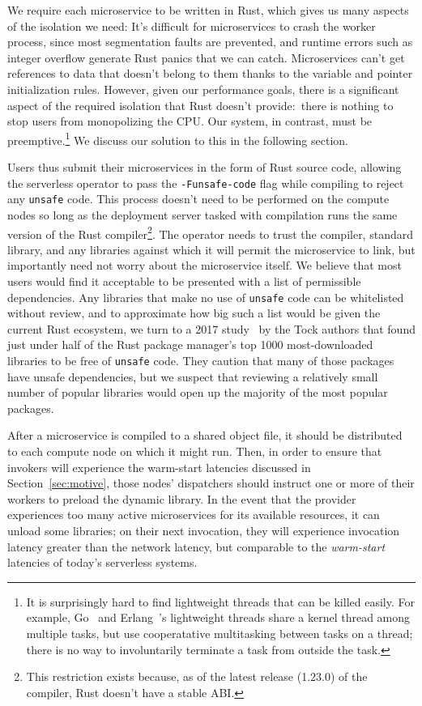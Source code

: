 We require each microservice to be written in Rust, which gives us many aspects of
the isolation we need:  It's difficult for microservices to crash the worker process,
since most segmentation faults are prevented, and runtime errors such as integer
overflow generate Rust panics that we can catch.  Microservices can't get references
to data that doesn't belong to them thanks to the variable and pointer initialization
rules.  
However, given our performance goals, there is a significant aspect of the
required isolation that Rust doesn't provide:\ there is nothing to stop users from
monopolizing the CPU.  Our system, in contrast, must be preemptive.\footnote{It is surprisingly hard to find lightweight
  threads that can be killed easily.  For example, 
Go~\cite{www-golang} and Erlang~\cite{www-erlang}'s lightweight threads
share a kernel thread among multiple tasks, but use cooperatative multitasking
between tasks on a thread;  there is no way to involuntarily terminate a task
from outside the task.}  We discuss our solution to this in the following
section.

Users thus submit their microservices in the form of Rust source code, allowing the
serverless operator to pass the \texttt{-Funsafe-code} flag while compiling to reject
any \texttt{unsafe} code.  This process doesn't need to be performed on the compute
nodes so long as the deployment server tasked with compilation runs the same version
of the Rust compiler\footnote{This restriction exists because, as of the latest
release (1.23.0) of the compiler, Rust doesn't have a stable ABI.}.  The operator
needs to trust the compiler, standard library, and any libraries against which it
will permit the microservice to link, but importantly need not worry about the
microservice itself.  We believe that most users would find it acceptable to be
presented with a list of permissible dependencies.  Any libraries that make no use of
\texttt{unsafe} code can be whitelisted without review, and to approximate how big
such a list would be given the current Rust ecosystem, we turn to a 2017
study~\cite{www-cratesio-unsafe} by the Tock authors that found just under half of
the Rust package manager's top 1000 most-downloaded libraries to be free of
\texttt{unsafe} code.  They caution that many of those packages have unsafe
dependencies, but we suspect that reviewing a relatively small number of popular
libraries would open up the majority of the most popular packages.

After a microservice is compiled to a shared object file, it should be distributed to
each compute node on which it might run.  Then, in order to ensure that invokers will
experience the warm-start latencies discussed in Section~\ref{sec:motive}, those
nodes' dispatchers should instruct one or more of their workers to preload the
dynamic library.  In the event that the provider experiences too many active
microservices for its available resources, it can unload some libraries; on their
next invocation, they will experience invocation latency greater than the network
latency, but comparable to the \textit{warm-start} latencies of today's serverless
systems.
